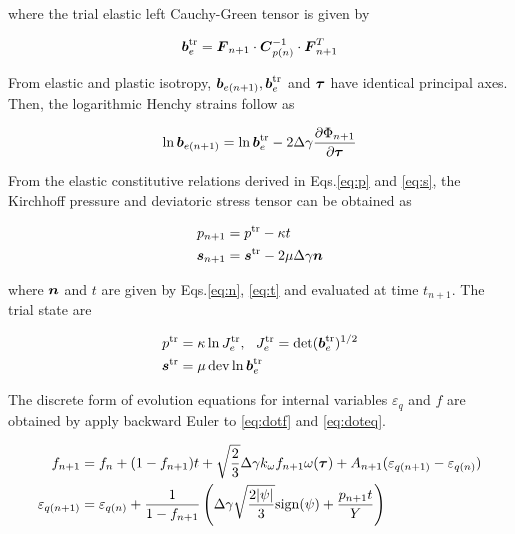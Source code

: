 where the trial elastic left Cauchy-Green tensor is given by

\begin{equation}\label{eq:betr}
{\boldsymbol{b}}_e^{\operatorname{\text{tr}}} = {\boldsymbol{F}}_{n+1}\cdot{\boldsymbol{C}}_{p(n)}^{-1}\cdot{\boldsymbol{F}}^T_{n+1}
\end{equation}

From elastic and plastic isotropy, ${\boldsymbol{b}}_{e(n+1)}, {\boldsymbol{b}}_e^{\operatorname{\text{tr}}}$ and ${\boldsymbol{\tau}}$ have identical principal axes. Then, the logarithmic Henchy strains follow as

\begin{equation}\label{eq:lnbetr}
\ln{\boldsymbol{b}}_{e(n+1)} = \ln{\boldsymbol{b}}_e^{\operatorname{\text{tr}}} - 2\Delta\gamma\frac{\partial\Phi_{n+1}}{\partial{\boldsymbol{\tau}}}
\end{equation}

From the elastic constitutive relations derived in Eqs.\eqref{eq:p} and \eqref{eq:s}, the Kirchhoff pressure and deviatoric stress tensor can be obtained as

\begin{align}
p_{n+1} &= p^{\operatorname{\text{tr}}} - \kappa t\label{eq:discrete_p}\\
{\boldsymbol{s}}_{n+1} &= {\boldsymbol{s}}^{\operatorname{\text{tr}}} - 2\mu\Delta\gamma {\boldsymbol{n}}\label{eq:discrete_s}
\end{align}

where ${\boldsymbol{n}}$ and $t$ are given by Eqs.\eqref{eq:n}, \eqref{eq:t} and evaluated at time $t_{n+1}$. The trial state are

\begin{align}
p^{\operatorname{\text{tr}}} &= \kappa\ln J_e^{\operatorname{\text{tr}}},~~J_e^{\operatorname{\text{tr}}} = \det({\boldsymbol{b}}_e^{\operatorname{\text{tr}}})^{1/2}\label{eq:ptr}\\
{\boldsymbol{s}}^{\operatorname{\text{tr}}}&= \mu\operatorname{\text{dev}}\ln{\boldsymbol{b}}_e^{\operatorname{\text{tr}}}\label{eq:str}
\end{align}

The discrete form of evolution equations for internal variables $\varepsilon_q$ and $f$ are obtained by apply backward Euler to \eqref{eq:dotf} and \eqref{eq:doteq}. 

\begin{align}
f_{n+1} &= f_n + (1-f_{n+1})t + \sqrt{\frac{2}{3}}\Delta\gamma  k_{\omega}f_{n+1} \omega({\boldsymbol{\tau}}) + A_{n+1}(\varepsilon_{q(n+1)} - \varepsilon_{q(n)})\label{eq:discrete_f}\\
\varepsilon_{q(n+1)} &= \varepsilon_{q(n)} + \frac{1}{1-f_{n+1}}\left(\Delta\gamma\sqrt{\frac{2|\psi|}{3}} {\rm sign}(\psi) + \frac{p_{n+1} t}{Y}\right)\label{eq:discrete_eq}
\end{align}


